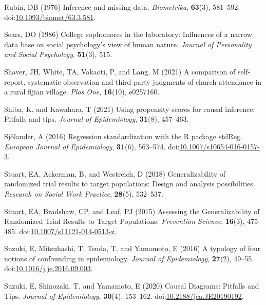 \documentclass[
  single column]{article}
\newlength{\cslhangindent}
\newenvironment{CSLReferences}[2] %
 {\begin{list}{}{%
  \setlength{\itemindent}{0pt}
  \setlength{\leftmargin}{0pt}
  \setlength{\parsep}{0pt}
  \ifodd #1
   \setlength{\leftmargin}{\cslhangindent}
   \setlength{\itemindent}{-1\cslhangindent}
  \fi
  \setlength{\itemsep}{#2\baselineskip}}}
 {\end{list}}
\begin{document}
\begin{CSLReferences}{1}{0}
Rubin, DB (1976) Inference and missing data. \emph{Biometrika},
\textbf{63}(3), 581--592.
doi:\href{https://doi.org/10.1093/biomet/63.3.581}{10.1093/biomet/63.3.581}.

Sears, DO (1986) College sophomores in the laboratory: Influences of a
narrow data base on social psychology's view of human nature.
\emph{Journal of Personality and Social Psychology}, \textbf{51}(3),
515.

Shaver, JH, White, TA, Vakaoti, P, and Lang, M (2021) A comparison of
self-report, systematic observation and third-party judgments of church
attendance in a rural fijian village. \emph{Plos One}, \textbf{16}(10),
e0257160.

Shiba, K, and Kawahara, T (2021) Using propensity scores for causal
inference: Pitfalls and tips. \emph{Journal of Epidemiology},
\textbf{31}(8), 457--463.

Sjölander, A (2016) Regression standardization with the R package
stdReg. \emph{European Journal of Epidemiology}, \textbf{31}(6),
563--574.
doi:\href{https://doi.org/10.1007/s10654-016-0157-3}{10.1007/s10654-016-0157-3}.

Stuart, EA, Ackerman, B, and Westreich, D (2018) Generalizability of
randomized trial results to target populations: Design and analysis
possibilities. \emph{Research on Social Work Practice}, \textbf{28}(5),
532--537.

Stuart, EA, Bradshaw, CP, and Leaf, PJ (2015) Assessing the
Generalizability of Randomized Trial Results to Target Populations.
\emph{Prevention Science}, \textbf{16}(3), 475--485.
doi:\href{https://doi.org/10.1007/s11121-014-0513-z}{10.1007/s11121-014-0513-z}.

Suzuki, E, Mitsuhashi, T, Tsuda, T, and Yamamoto, E (2016) A typology of
four notions of confounding in epidemiology. \emph{Journal of
Epidemiology}, \textbf{27}(2), 49--55.
doi:\href{https://doi.org/10.1016/j.je.2016.09.003}{10.1016/j.je.2016.09.003}.

Suzuki, E, Shinozaki, T, and Yamamoto, E (2020) Causal Diagrams:
Pitfalls and Tips. \emph{Journal of Epidemiology}, \textbf{30}(4),
153--162.
doi:\href{https://doi.org/10.2188/jea.JE20190192}{10.2188/jea.JE20190192}.


\end{CSLReferences}
\end{document}
